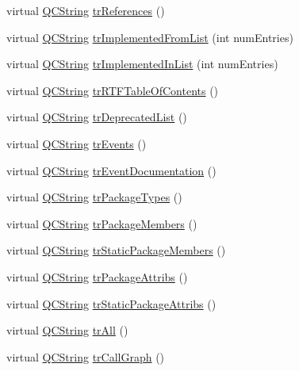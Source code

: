 \begin{DoxyCompactItemize}
virtual \hyperlink{class_q_c_string}{Q\-C\-String} \hyperlink{class_translator_croatian_a54eaa9a933568bfd7eaffe36b7872eb0}{tr\-References} ()
\item 
virtual \hyperlink{class_q_c_string}{Q\-C\-String} \hyperlink{class_translator_croatian_a01f548ba9f63fd42bc070ba1247e6543}{tr\-Implemented\-From\-List} (int num\-Entries)
\item 
virtual \hyperlink{class_q_c_string}{Q\-C\-String} \hyperlink{class_translator_croatian_aa2aa7d2d195ce999a256e7769605c0f0}{tr\-Implemented\-In\-List} (int num\-Entries)
\item 
virtual \hyperlink{class_q_c_string}{Q\-C\-String} \hyperlink{class_translator_croatian_aacd8ff5b2dcf79f4e8e72625d624a206}{tr\-R\-T\-F\-Table\-Of\-Contents} ()
\item 
virtual \hyperlink{class_q_c_string}{Q\-C\-String} \hyperlink{class_translator_croatian_af7a7f1e3eaf6bc4c1026cfb73fbf486a}{tr\-Deprecated\-List} ()
\item 
virtual \hyperlink{class_q_c_string}{Q\-C\-String} \hyperlink{class_translator_croatian_a43ec7331f50b74dc31b6d4e13879c93a}{tr\-Events} ()
\item 
virtual \hyperlink{class_q_c_string}{Q\-C\-String} \hyperlink{class_translator_croatian_afb5c66237dd5bce42714ec9616a29887}{tr\-Event\-Documentation} ()
\item 
virtual \hyperlink{class_q_c_string}{Q\-C\-String} \hyperlink{class_translator_croatian_a835fa6d7f51082a0d730d4759cbc5999}{tr\-Package\-Types} ()
\item 
virtual \hyperlink{class_q_c_string}{Q\-C\-String} \hyperlink{class_translator_croatian_a595a1ba7b4f631a384b17e3c2084e271}{tr\-Package\-Members} ()
\item 
virtual \hyperlink{class_q_c_string}{Q\-C\-String} \hyperlink{class_translator_croatian_a8f144cf1daf28327dec2fe32c7fcb020}{tr\-Static\-Package\-Members} ()
\item 
virtual \hyperlink{class_q_c_string}{Q\-C\-String} \hyperlink{class_translator_croatian_a08c0faf15df5fa930b5dc9f87322d07a}{tr\-Package\-Attribs} ()
\item 
virtual \hyperlink{class_q_c_string}{Q\-C\-String} \hyperlink{class_translator_croatian_a0312be02ff137359290b596cf1d4d708}{tr\-Static\-Package\-Attribs} ()
\item 
virtual \hyperlink{class_q_c_string}{Q\-C\-String} \hyperlink{class_translator_croatian_afba06c0d2fb2ce2775c541d44b805758}{tr\-All} ()
\item 
virtual \hyperlink{class_q_c_string}{Q\-C\-String} \hyperlink{class_translator_croatian_a5eb7947fa59555756d25476f922cde01}{tr\-Call\-Graph} ()

\end{DoxyCompactItemize}
